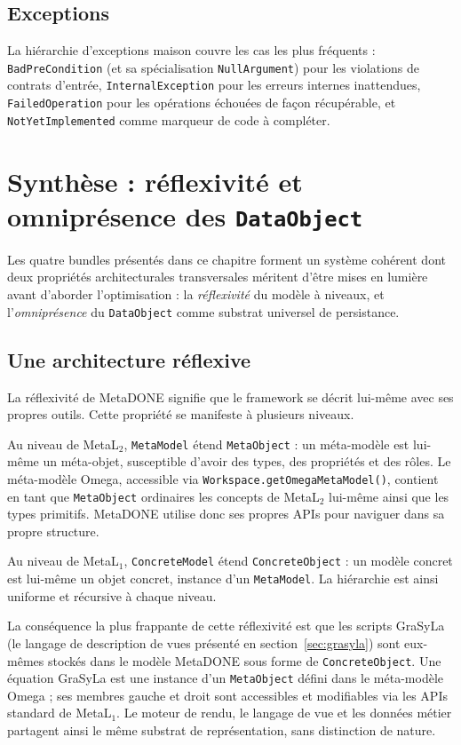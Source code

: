 \subsection{Exceptions}

La hiérarchie d'exceptions maison couvre les cas les plus fréquents :
\texttt{BadPreCondition} (et sa spécialisation \texttt{NullArgument})
pour les violations de contrats d'entrée, \texttt{InternalException}
pour les erreurs internes inattendues, \texttt{FailedOperation} pour les
opérations échouées de façon récupérable, et \texttt{NotYetImplemented}
comme marqueur de code à compléter.

\section[Synthèse]{Synthèse : réflexivité et omniprésence des \texttt{DataObject}}
\label{sec:reflexivite}

Les quatre bundles présentés dans ce chapitre forment un système cohérent
dont deux propriétés architecturales transversales méritent d'être mises
en lumière avant d'aborder l'optimisation : la \emph{réflexivité} du
modèle à niveaux, et l'\emph{omniprésence} du \texttt{DataObject} comme substrat universel de persistance.

\subsection{Une architecture réflexive}

La réflexivité de MetaDONE signifie que le framework se décrit lui-même
avec ses propres outils. Cette propriété se manifeste à plusieurs niveaux.

Au niveau de MetaL$_2$, \texttt{MetaModel} étend \texttt{MetaObject} : un
méta-modèle est lui-même un méta-objet, susceptible d'avoir des types,
des propriétés et des rôles. Le méta-modèle Omega, accessible via
\texttt{Workspace.getOmegaMetaModel()}, contient en tant que
\texttt{MetaObject} ordinaires les concepts de MetaL$_2$ lui-même ainsi que les types primitifs. MetaDONE utilise
donc ses propres APIs pour naviguer dans sa propre structure.

Au niveau de MetaL$_1$, \texttt{ConcreteModel} étend \texttt{ConcreteObject}
: un modèle concret est lui-même un objet concret, instance d'un
\texttt{MetaModel}. La hiérarchie est ainsi uniforme et récursive à
chaque niveau.

La conséquence la plus frappante de cette réflexivité est que les scripts
GraSyLa (le langage de description de vues présenté en
section~\ref{sec:grasyla}) sont eux-mêmes stockés dans le modèle MetaDONE sous forme de \texttt{ConcreteObject}. Une équation GraSyLa est une instance d'un \texttt{MetaObject} défini dans le méta-modèle Omega ;
ses membres gauche et droit sont accessibles et modifiables via les APIs
standard de MetaL$_1$. Le moteur de rendu, le langage de vue et les données
métier partagent ainsi le même substrat de représentation, sans
distinction de nature.

